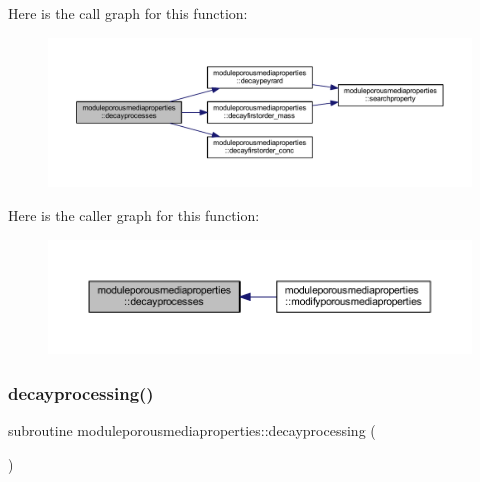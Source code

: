 Here is the call graph for this function\+:\nopagebreak
\begin{figure}[H]
\begin{center}
\leavevmode
\includegraphics[width=350pt]{namespacemoduleporousmediaproperties_a09a5fbeb9b55249ae5b934510525a8ff_cgraph}
\end{center}
\end{figure}
Here is the caller graph for this function\+:\nopagebreak
\begin{figure}[H]
\begin{center}
\leavevmode
\includegraphics[width=350pt]{namespacemoduleporousmediaproperties_a09a5fbeb9b55249ae5b934510525a8ff_icgraph}
\end{center}
\end{figure}
\mbox{\label{namespacemoduleporousmediaproperties_a9e33074d02a745b0e8cd90eccef5b5ed}} 
\subsubsection{\texorpdfstring{decayprocessing()}{decayprocessing()}}
{\footnotesize\ttfamily subroutine moduleporousmediaproperties\+::decayprocessing (\begin{DoxyParamCaption}{ }\end{DoxyParamCaption})\hspace{0.3cm}{\ttfamily [private]}}

